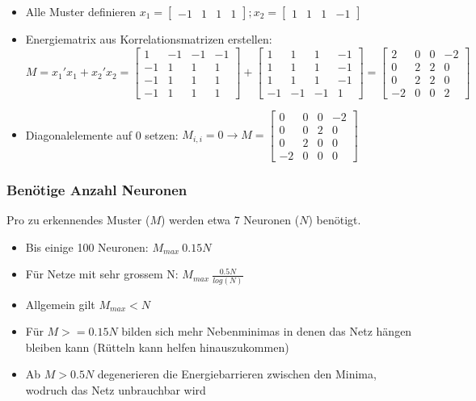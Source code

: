 \begin{itemize}
	\item Alle Muster definieren $x_1 = \begin{bmatrix}-1&1&1&1 \end{bmatrix};
			x_2 = \begin{bmatrix}1&1&1&-1\end{bmatrix}$
	\item Energiematrix aus Korrelationsmatrizen erstellen: $M = x_1' x_1 + x_2'
		x_2 =
		\begin{bmatrix}
			 1&-1&-1&-1 \\
			-1& 1& 1& 1 \\
			-1& 1& 1& 1 \\
			-1& 1& 1& 1
		\end{bmatrix} +
		\begin{bmatrix}
			 1& 1& 1&-1\\
			 1& 1& 1&-1\\
			 1& 1& 1&-1\\
			-1&-1&-1& 1
		\end{bmatrix} =
		\begin{bmatrix}
			 2&0&0&-2\\
			 0&2&2& 0\\
			 0&2&2& 0\\
			-2&0&0& 2
		\end{bmatrix}$
	\item Diagonalelemente auf 0 setzen: $M_{i,i} = 0 \rightarrow
		M=\begin{bmatrix}
			 0&0&0&-2\\
			 0&0&2& 0\\
			 0&2&0& 0\\
			-2&0&0& 0
		\end{bmatrix}$
\end{itemize}
\subsubsection{Benötige Anzahl Neuronen}
Pro zu erkennendes Muster ($M$) werden etwa 7 Neuronen ($N$) benötigt.
\begin{itemize}
	\item Bis einige 100 Neuronen: $M_{max} ~ 0.15N$
	\item Für Netze mit sehr grossem N: $M_{max} ~ \frac{0.5N}{log(N)}$
	\item Allgemein gilt $M_{max} < N$
	\item Für $M >= 0.15N$ bilden sich mehr Nebenminimas in denen das Netz
		hängen bleiben kann (Rütteln kann helfen hinauszukommen)
	\item Ab $M > 0.5N$ degenerieren die Energiebarrieren zwischen den Minima,
		wodruch das Netz unbrauchbar wird
\end{itemize}

